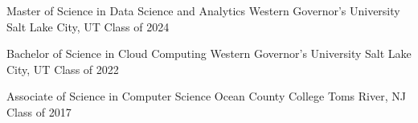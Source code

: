 

\begin{cventries}

	\cventry
	{Master of Science in Data Science and Analytics} %
	{Western Governor's University} %
	{Salt Lake City, UT} %
	{Class of 2024} %
	{
		\begin{cvitems} %
		\end{cvitems}
	}

	\cventry
	{Bachelor of Science in Cloud Computing} %
	{Western Governor's University} %
	{Salt Lake City, UT} %
	{Class of 2022} %
	{
		\begin{cvitems} %
		\end{cvitems}
	}

	\cventry
	{Associate of Science in Computer Science} %
	{Ocean County College} %
	{Toms River, NJ} %
	{Class of 2017} %
	{
		\begin{cvitems} %
		\end{cvitems}
	}


\end{cventries}
